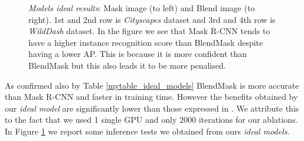 \documentclass[10pt,twocolumn,letterpaper]{article}
\begin{document}
\begin{figure}[H]
  \caption{\textit{Models ideal results}: Mask image (to left) and Blend image (to right). 1st and 2nd row is \textit{Cityscapes} dataset and 3rd and 4th row is \textit{WildDash} dataset. In the figure we see that Mask R-CNN tends to have a higher instance recognition score than BlendMask despite having a lower AP. This is because it is more confident than BlendMask but this also leads it to be more penalised.}
  \label{fig:result_model_ideal}
\noindent
\end{figure}
As confirmed also by Table \ref{mytable_ideal_models} BlendMask is more accurate than Mask R-CNN and faster in training time. However the benefits obtained by our \textit{ideal model} are significantly lower than those expressed in \cite{Authors2_BlendMask}. We attribute this to the fact that we used 1 single GPU and only 2000 iterations for our ablations.
In Figure \ref{fig:result_model_ideal} we report some inference tests we obtained from ours \textit{ideal models}.

\end{document}
